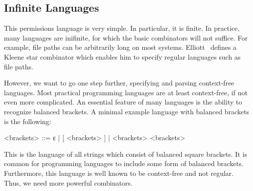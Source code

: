 \subsection{Infinite Languages}

This permissions language is very simple. In particular, it is finite. In practice, many languages are inifinite, for which the basic combinators will not suffice. For example, file paths can be arbitrarily long on most systems.
Elliott~\cite{conal-languages} defines a Kleene star combinator which enables him to specify regular languages such as file paths.

However, we want to go one step further, specifying and parsing context-free
languages. Most practical programming languages are at least context-free, if
not even more complicated. An essential feature of many languages is the ability
to recognize balanced brackets. A minimal example language with balanced
brackets is the following:
%
\begin{grammar}
<brackets> ::= ε | [ <brackets> ] | <brackets> <brackets>
\end{grammar}
%
This is the language of all strings which consist of balanced square brackets. 
It is common for programming languages to include some form of balanced
brackets. Furthermore, this language is well known to be context-free and not
regular. Thus, we need more powerful combinators.

